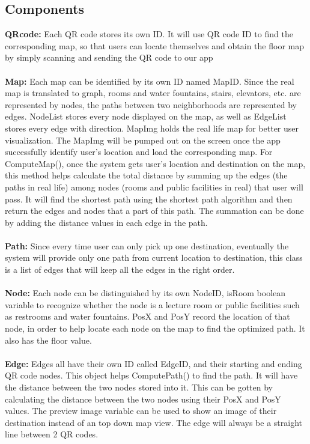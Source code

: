 \documentclass[12pt]{article}
\begin{document}
\subsection{Components}
\textbf{QRcode:}	Each QR code stores its own ID. It will use QR code ID to find the corresponding map, so that users can locate themselves and obtain the floor map by simply scanning and sending the QR code to our app \\ \\
\textbf{Map: }
	Each map can be identified by its own ID named MapID. Since the real map is translated to graph, rooms and water fountains, stairs, elevators, etc. are represented by nodes, the paths between two neighborhoods are represented by edges. NodeList stores every node displayed on the map, as well as EdgeList stores every edge with direction.  MapImg holds the real life map for better user visualization.  The MapImg will be pumped out on the screen once the app successfully identify user’s location and load the corresponding map. 
 For ComputeMap(), once the system gets user’s location and destination on the map, this method helps calculate the total distance by summing up the edges (the paths in real life) among nodes (rooms and public facilities in real) that user will pass. It will find the shortest path using the shortest path algorithm and then return the edges and nodes that a part of this path. The summation can be done by adding the distance values in each edge in the path. \\ \\

\textbf{Path:}	Since every time user can only pick up one destination, eventually the system will provide only one path from current location to destination, this class is a list of edges that will keep all the edges in the right order.  \\ \\

\textbf{Node:}
Each node can be distinguished by its own NodeID, isRoom boolean variable to recognize whether the node is a lecture room or public facilities such as restrooms and water fountains. PosX and PosY record the location of that node, in order to help locate each node on the map to find the optimized path. It also has the floor value.\\ \\
  
\textbf{Edge:}
Edges all have their own ID called EdgeID, and their starting and ending QR code nodes. This object helps ComputePath() to find the path. It will have the distance between the two nodes stored into it. This can be gotten by calculating the distance between the two nodes using their PosX and PosY values. The preview image variable can be used to show an image of their destination instead of an top down map view. The edge will always be a straight line between 2 QR codes.\\ \\
\end{document}
